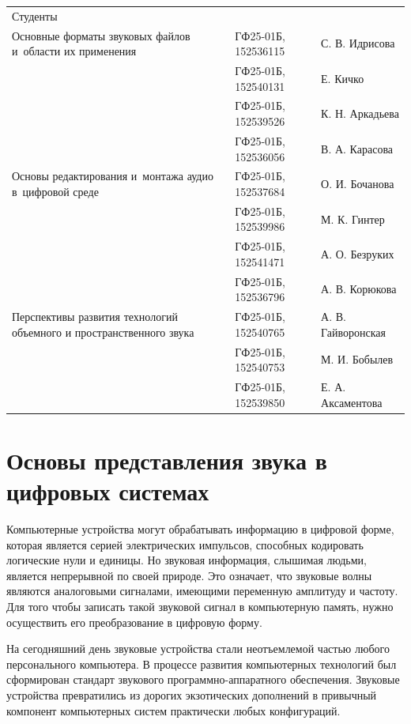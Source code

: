 \documentclass{ou}
\begin{document}
\begin{flushleft}
\doublespacing
\begin{tabularx}{\textwidth}{@{} p{} l l @{}}
Студенты     &                     &         \\
\multirow{-2.27}{\hsize}{\singlespacing Основные форматы звуковых файлов и~области их применения}
             & ГФ25-01Б, 152536115 & С. В. Идрисова\\
             & ГФ25-01Б, 152540131 & Е. Кичко\\
             & ГФ25-01Б, 152539526 & К. Н. Аркадьева\\
             & ГФ25-01Б, 152536056 & В. А. Карасова\\
\multirow{-2.27}{\hsize}{\singlespacing Основы редактирования и~монтажа аудио в~цифровой среде}
             & ГФ25-01Б, 152537684 & О. И. Бочанова\\
             & ГФ25-01Б, 152539986 & М. К. Гинтер\\
             & ГФ25-01Б, 152541471 & А. О. Безруких\\
             & ГФ25-01Б, 152536796 & А. В. Корюкова\\
\multirow{-2.27}{\hsize}{\singlespacing Перспективы развития технологий объемного и пространственного звука}
             & ГФ25-01Б, 152540765 & А. В. Гайворонская\\
             & ГФ25-01Б, 152540753 & М. И. Бобылев\\
             & ГФ25-01Б, 152539850 & Е. А. Аксаментова\\
            
\end{tabularx}
\end{flushleft}
\newpage
{
\sloppy
\tableofcontents
}
\newpage
\onehalfspacing
\section{Основы представления звука в цифровых системах}
Компьютерные устройства могут обрабатывать информацию в цифровой форме, которая является серией электрических импульсов, способных кодировать логические нули и единицы. Но звуковая информация, слышимая людьми, является непрерывной по своей природе. Это означает, что звуковые волны являются аналоговыми сигналами, имеющими переменную амплитуду и частоту. Для того чтобы записать такой звуковой сигнал в компьютерную память, нужно осуществить его преобразование в цифровую форму\cite{spravochnik}.

На сегодняшний день звуковые устройства стали неотъемлемой частью любого персонального компьютера. В процессе развития компьютерных технологий был сформирован стандарт звукового программно-аппаратного обеспечения. Звуковые устройства превратились из дорогих экзотических дополнений в привычный компонент компьютерных систем практически любых конфигураций.
\end{document}
